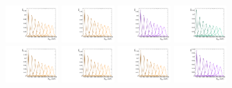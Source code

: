 \begin{figure}[htbp]
  \includegraphics[width=0.18\textwidth]{fig/2Dfit/templateSignalVsMX_fromDC_RadToWW_MVV_mu_LP_nobb_LDy.pdf}
  \includegraphics[width=0.18\textwidth]{fig/2Dfit/templateSignalVsMX_fromDC_ZprToWW_MVV_mu_LP_nobb_LDy.pdf}
  \includegraphics[width=0.18\textwidth]{fig/2Dfit/templateSignalVsMX_fromDC_WprToWZ_MVV_mu_LP_nobb_LDy.pdf}
  \includegraphics[width=0.18\textwidth]{fig/2Dfit/templateSignalVsMX_fromDC_WprToWH_MVV_mu_LP_nobb_LDy.pdf}\\
  \includegraphics[width=0.18\textwidth]{fig/2Dfit/templateSignalVsMX_fromDC_GbuToWW_MVV_mu_HP_vbf_LDy.pdf}
  \includegraphics[width=0.18\textwidth]{fig/2Dfit/templateSignalVsMX_fromDC_RadToWW_MVV_mu_HP_vbf_LDy.pdf}
  \includegraphics[width=0.18\textwidth]{fig/2Dfit/templateSignalVsMX_fromDC_ZprToWW_MVV_mu_HP_vbf_LDy.pdf}
  \includegraphics[width=0.18\textwidth]{fig/2Dfit/templateSignalVsMX_fromDC_WprToWZ_MVV_mu_HP_vbf_LDy.pdf}

\end{figure}
